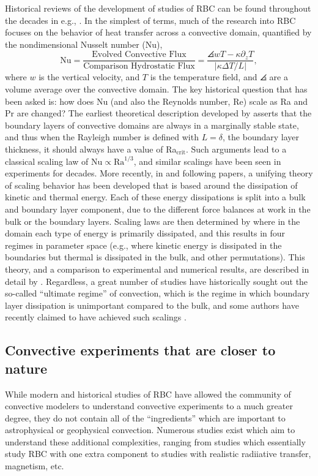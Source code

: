 Historical reviews of the development of studies of RBC can be found throughout the decades in e.g., \citet{busse1978, siggia1994, ahlers&all2009}.
In the simplest of terms, much of the research into RBC focuses on the behavior of heat transfer across a convective domain, quantified by the nondimensional Nusselt number (Nu),
\begin{equation}
\text{Nu} = \frac{\text{Evolved Convective Flux}}{\text{Comparison Hydrostatic Flux}} = \frac{\angles{w T - \kappa \partial_z T}}{|\kappa \Delta T / L|},
\end{equation}
where $w$ is the vertical velocity, and $T$ is the temperature field, and $\angles{}$ are a volume average over the convective domain.
The key historical question that has been asked is: how does Nu (and also the Reynolds number, Re) scale as Ra and Pr are changed?
The earliest theoretical description developed by \citet{malkus1954} asserts that the boundary layers of convective domains are always in a marginally stable state, and thus when the Rayleigh number is defined with $L = \delta$, the boundary layer thickness, it should always have a value of Ra$_{\text{crit}}$.
Such arguments lead to a classical scaling law of $\text{Nu} \propto \text{Ra}^{1/3}$, and similar scalings have been seen in experiments for decades.
More recently, in \citet{grossman&lohse2000} and following papers, a unifying theory of scaling behavior has been developed that is based around the dissipation of kinetic and thermal energy.
Each of these energy dissipations is split into a bulk and boundary layer component, due to the different force balances at work in the bulk or the boundary layers.
Scaling laws are then determined by where in the domain each type of energy is primarily dissipated, and this results in four regimes in parameter space (e.g., where kinetic energy is dissipated in the boundaries but thermal is dissipated in the bulk, and other permutations).
This theory, and a comparison to experimental and numerical results, are described in detail by \citet{ahlers&all2009}.
Regardless, a great number of studies have historically sought out the so-called ``ultimate regime'' of convection, which is the regime in which boundary layer dissipation is unimportant compared to the bulk, and some authors have recently claimed to have achieved such scalings \citep[see e.g.,][]{zhu&all2018}.

\subsection{Convective experiments that are closer to nature}
While modern and historical studies of RBC have allowed the community of convective modelers to understand convective experiments to a much greater degree, they do not contain all of the ``ingredients'' which are important to astrophysical or geophysical convection.
Numerous studies exist which aim to understand these additional complexities, ranging from studies which essentially study RBC with one extra component to studies with realistic radiiative transfer, magnetism, etc.

